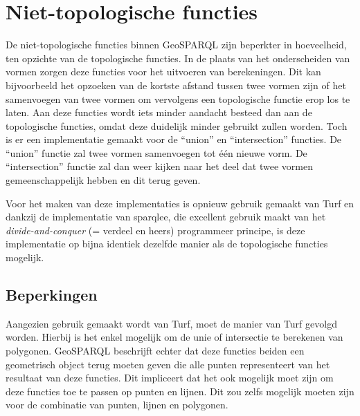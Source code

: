 \section{Niet-topologische functies}
\label{sec:niet_topologische_functies}
De niet-topologische functies binnen GeoSPARQL zijn beperkter in hoeveelheid, ten opzichte van de topologische functies. In de plaats van het onderscheiden van vormen zorgen deze functies voor het uitvoeren van berekeningen. Dit kan bijvoorbeeld het opzoeken van de kortste afstand tussen twee vormen zijn of het samenvoegen van twee vormen om vervolgens een topologische functie erop los te laten. Aan deze functies wordt iets minder aandacht besteed dan aan de topologische functies, omdat deze duidelijk minder gebruikt zullen worden. Toch is er een implementatie gemaakt voor de ``union'' en ``intersection'' functies. De ``union'' functie zal twee vormen samenvoegen tot één nieuwe vorm. De ``intersection'' functie zal dan weer kijken naar het deel dat twee vormen gemeenschappelijk hebben en dit terug geven. 

Voor het maken van deze implementaties is opnieuw gebruik gemaakt van Turf en dankzij de implementatie van sparqlee, die excellent gebruik maakt van het \textit{divide-and-conquer} (= verdeel en heers) programmeer principe, is deze implementatie op bijna identiek dezelfde manier als de topologische functies mogelijk.

\subsection{Beperkingen}
Aangezien gebruik gemaakt wordt van Turf, moet de manier van Turf gevolgd worden. Hierbij is het enkel mogelijk om de unie of intersectie te berekenen van polygonen. GeoSPARQL beschrijft echter dat deze functies beiden een geometrisch object terug moeten geven die alle punten representeert van het resultaat van deze functies. Dit impliceert dat het ook mogelijk moet zijn om deze functies toe te passen op punten en lijnen. Dit zou zelfs mogelijk moeten zijn voor de combinatie van punten, lijnen en polygonen.

